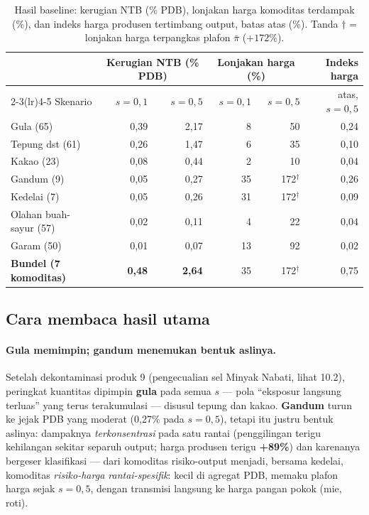 \documentclass[11pt,a4paper]{article}
\begin{document}
\begin{table}[ht]
\centering\small
\caption{Hasil baseline: kerugian NTB (\% PDB), lonjakan harga komoditas
terdampak (\%), dan indeks harga produsen tertimbang output, batas atas
(\%). Tanda $\dagger$ = lonjakan harga terpangkas plafon $\bar\pi$
($+172\%$).}
\label{tab:hasil}
\begin{tabular}{@{}lrrrrr@{}}
\toprule
& \multicolumn{2}{c}{Kerugian NTB (\% PDB)} &
  \multicolumn{2}{c}{Lonjakan harga (\%)} & Indeks harga \\
\cmidrule(lr){2-3}\cmidrule(lr){4-5}
Skenario & $s{=}0{,}1$ & $s{=}0{,}5$ & $s{=}0{,}1$ & $s{=}0{,}5$ &
atas, $s{=}0{,}5$ \\
\midrule
Gula (65)             & 0{,}39 & 2{,}17 & 8  & 50            & 0{,}24 \\
Tepung dst (61)       & 0{,}26 & 1{,}47 & 6  & 35            & 0{,}10 \\
Kakao (23)            & 0{,}08 & 0{,}44 & 2  & 10            & 0{,}04 \\
Gandum (9)            & 0{,}05 & 0{,}27 & 35 & 172$^\dagger$ & 0{,}26 \\
Kedelai (7)           & 0{,}05 & 0{,}26 & 31 & 172$^\dagger$ & 0{,}09 \\
Olahan buah-sayur (57)& 0{,}02 & 0{,}11 & 4  & 22            & 0{,}04 \\
Garam (50)            & 0{,}01 & 0{,}07 & 13 & 92            & 0{,}02 \\
\midrule
\textbf{Bundel (7 komoditas)} & \textbf{0{,}48} & \textbf{2{,}64} &
  35 & 172$^\dagger$ & 0{,}75 \\
\bottomrule
\end{tabular}
\end{table}

\subsection{Cara membaca hasil utama}

\paragraph{Gula memimpin; gandum menemukan bentuk aslinya.} Setelah
dekontaminasi produk 9 (pengecualian sel Minyak Nabati, lihat 10.2),
peringkat kuantitas dipimpin \textbf{gula} pada semua $s$ --- pola
``eksposur langsung terluas'' yang terus terakumulasi --- disusul tepung
dan kakao. \textbf{Gandum} turun ke jejak PDB yang moderat (0{,}27\% pada
$s = 0{,}5$), tetapi itu justru bentuk aslinya: dampaknya
\emph{terkonsentrasi} pada satu rantai (penggilingan terigu kehilangan
sekitar separuh output; harga produsen terigu \textbf{+89\%}) dan
karenanya bergeser klasifikasi --- dari komoditas risiko-output menjadi,
bersama kedelai, komoditas \emph{risiko-harga rantai-spesifik}: kecil di
agregat PDB, memaku plafon harga sejak $s = 0{,}5$, dengan transmisi
langsung ke harga pangan pokok (mie, roti).
\end{document}
